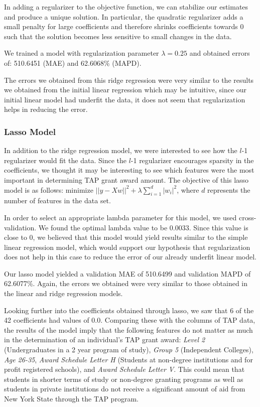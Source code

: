 \documentclass[12pt, fleqn]{article}
\begin{document}
	In adding a regularizer to the objective function, we can stabilize our estimates and produce a unique solution. In particular, the quadratic regularizer adds a small penalty for large coefficients and therefore shrinks coefficients towards 0 such that the solution becomes less sensitive to small changes in the data. 

	We trained a model with regularization parameter $\lambda = 0.25$ and obtained errors of: 510.6451 (MAE) and 62.6068\% (MAPD). 

	The errors we obtained from this ridge regression were very similar to the results we obtained from the initial linear regression which may be intuitive, since our initial linear model had underfit the data, it does not seem that regularization helps in reducing the error.


\subsubsection{Lasso Model}
	In addition to the ridge regression model, we were interested to see how the $l$-1 regularizer would fit the data. Since the $l$-1 regularizer encourages sparsity in the coefficients, we thought it may be interesting to see which features were the most important in determining TAP grant award amount. The objective of this lasso model is as follows: minimize $|| y - Xw ||^2 + \lambda \sum_{i=1}^{d} |w_i|^2$, where $d$ represents the number of features in the data set. 

	In order to select an appropriate lambda parameter for this model, we used cross-validation. We found the optimal lambda value to be 0.0033. Since this value is close to 0, we believed that this model would yield results similar to the simple linear regression model, which would support our hypothesis that regularization does not help in this case to reduce the error of our already underfit linear model.

	Our lasso model yielded a validation MAE of 510.6499 and validation MAPD of 62.6077\%. Again, the errors we obtained were very similar to those obtained in the linear and ridge regression models. 

	Looking further into the coefficients obtained through lasso, we saw that 6 of the 42 coefficients had values of 0.0. Comparing these with the columns of TAP data, the results of the model imply that the following features do not matter as much in the determination of an individual's TAP grant award: \textit{Level 2} (Undergraduates in a 2 year program of study), \textit{Group 5} (Independent Colleges), \textit{Age 26-35}, \textit{Award Schedule Letter H} (Students at non-degree institutions and for profit registered schools), and \textit{Award Schedule Letter V}. This could mean that students in shorter terms of study or non-degree granting programs as well as students in private institutions do not receive a significant amount of aid from New York State through the TAP program.
\end{document}
